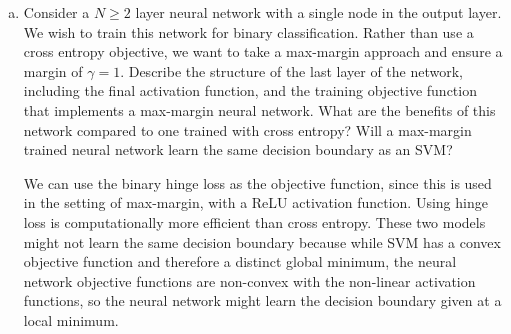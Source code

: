\documentclass{article}
\begin{document}
\begin{enumerate}[(a)]
	\item Consider a $N\ge2$ layer neural network with a single node in the output layer. We wish to train this network for binary classification. Rather than use a cross entropy objective, we want to take a max-margin approach and ensure a margin of $\gamma=1$. Describe the structure of the last layer of the network, including the final activation function, and the training objective function that implements a max-margin neural network. What are the benefits of this network compared to one trained with cross entropy? Will a max-margin trained neural network learn the same decision boundary as an SVM?
		\begin{answer*}
			We can use the binary hinge loss as the objective function, since this is used in the setting of max-margin, with a ReLU activation function. Using hinge loss is computationally more efficient than cross entropy. These two models might not learn the same decision boundary because while SVM has a convex objective function and therefore a distinct global minimum, the neural network objective functions are non-convex with the non-linear activation functions, so the neural network might learn the decision boundary given at a local minimum.
		\end{answer*}


\end{enumerate}
\end{document}
